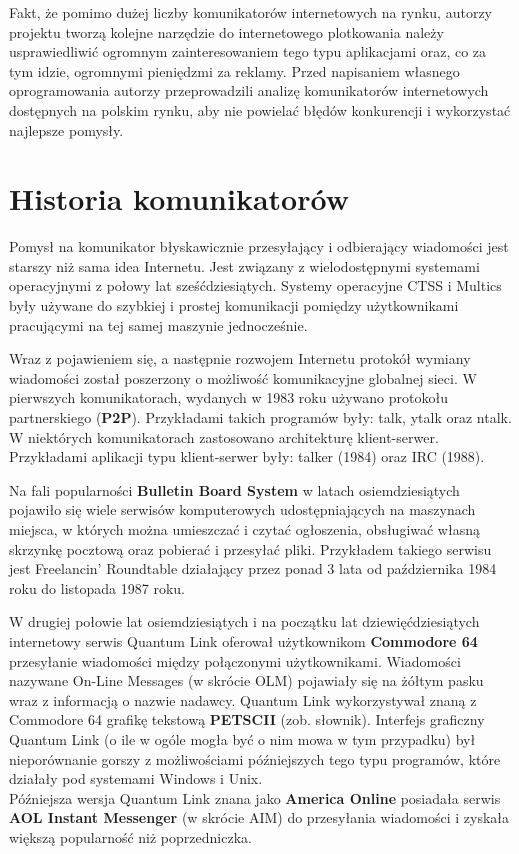\documentclass[a4paper,12pt]{article}
\begin{document}
\par Fakt, że pomimo dużej liczby komunikatorów internetowych na rynku, autorzy projektu tworzą kolejne narzędzie do internetowego plotkowania należy usprawiedliwić ogromnym zainteresowaniem tego typu aplikacjami oraz, co za tym idzie, ogromnymi pieniędzmi za reklamy. Przed napisaniem własnego oprogramowania autorzy przeprowadzili analizę komunikatorów internetowych dostępnych na polskim rynku, aby nie powielać błędów konkurencji i wykorzystać najlepsze pomysły.

\section[Historia komunikatorów]{Historia komunikatorów}
Pomysł na komunikator błyskawicznie przesyłający i odbierający wiadomości jest starszy niż sama idea Internetu. Jest związany z wielodostępnymi systemami operacyjnymi z połowy lat sześćdziesiątych. Systemy operacyjne CTSS i Multics były używane do szybkiej i prostej komunikacji pomiędzy użytkownikami pracującymi na tej samej maszynie jednocześnie.

\par Wraz z pojawieniem się, a następnie rozwojem Internetu protokół wymiany wiadomości został poszerzony o możliwość komunikacyjne globalnej sieci. W pierwszych komunikatorach, wydanych w 1983 roku używano protokołu
partnerskiego (\textbf{P2P}). Przykładami takich programów były: talk, ytalk oraz ntalk.
W niektórych komunikatorach zastosowano architekturę klient-serwer. Przykładami aplikacji typu klient-serwer były: talker (1984) oraz IRC (1988).

\newpage
Na fali popularności \textbf{Bulletin Board System} w latach osiemdziesiątych pojawiło się wiele serwisów komputerowych udostępniających na maszynach miejsca, w których można umieszczać i czytać ogłoszenia, obsługiwać własną skrzynkę pocztową oraz pobierać i przesyłać pliki.
Przykładem takiego serwisu jest Freelancin' Roundtable działający przez ponad 3 lata od października 1984 roku do listopada 1987 roku.

\par W drugiej połowie lat osiemdziesiątych i na początku lat dziewięćdziesiątych internetowy serwis Quantum Link oferował użytkownikom \textbf{Commodore 64} przesyłanie wiadomości między połączonymi użytkownikami. Wiadomości nazywane On-Line Messages (w skrócie OLM) pojawiały się na żółtym pasku wraz z informacją o nazwie nadawcy. Quantum Link wykorzystywał znaną z Commodore 64 grafikę tekstową \textbf{PETSCII} (zob. słownik). Interfejs graficzny Quantum Link  (o ile w ogóle mogła być o nim mowa w tym przypadku) był nieporównanie gorszy z możliwościami późniejszych tego typu programów, które działały pod systemami Windows i Unix.\\
Późniejsza wersja Quantum Link znana jako \textbf{America Online} posiadała serwis \textbf{AOL Instant Messenger} (w skrócie AIM) do przesyłania wiadomości i zyskała większą popularność niż poprzedniczka.
\end{document}
